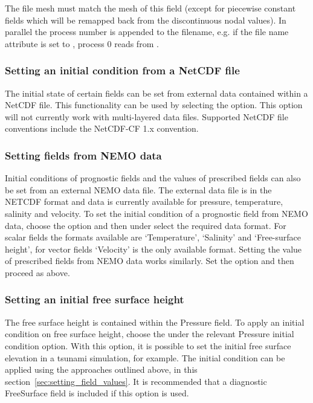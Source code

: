 The file mesh must match the mesh of this field (except for piecewise constant
fields which will be remapped back from the discontinuous nodal values). In
parallel the process number is appended to the filename, e.g. if the file name
attribute is set to , process 0 reads from .

\subsubsection{Setting an initial condition from a NetCDF file}\label{sec:setting_from_netcdf}

The initial state of certain fields can be set from external data contained within a NetCDF file.
This functionality can be used by selecting the 
option.
This option will not currently work with multi-layered data files. Supported
NetCDF file conventions include the NetCDF-CF 1.x convention.

\subsubsection{Setting fields from NEMO data}\label{sec:setting_from_nemo}
Initial conditions of prognostic fields and the values of prescribed fields can also be set from an external NEMO
data file. The external data file is in the NETCDF format and data is currently available for pressure, temperature, salinity
and velocity. To set the initial condition of a prognostic field from NEMO data, choose the option 
 and then under  select the required data format. For scalar fields
the formats available are `Temperature', `Salinity' and `Free-surface height', for vector fields `Velocity' is the only available format.
Setting the value of prescribed fields from NEMO data works similarly. Set the option  and then proceed as above.

\subsubsection{Setting an initial free surface height}\label{sec:setting_free_surface_height}
The free surface height is contained within the Pressure field.  To apply an initial condition on free surface height, 
choose the  under the relevant Pressure initial condition option.
With this option, it is possible to set the initial free surface elevation in a tsunami simulation, for example.
The initial condition can be applied using the approaches outlined above, in this section~\ref{sec:setting_field_values}.
It is recommended that a diagnostic FreeSurface field is included if this option is used.

